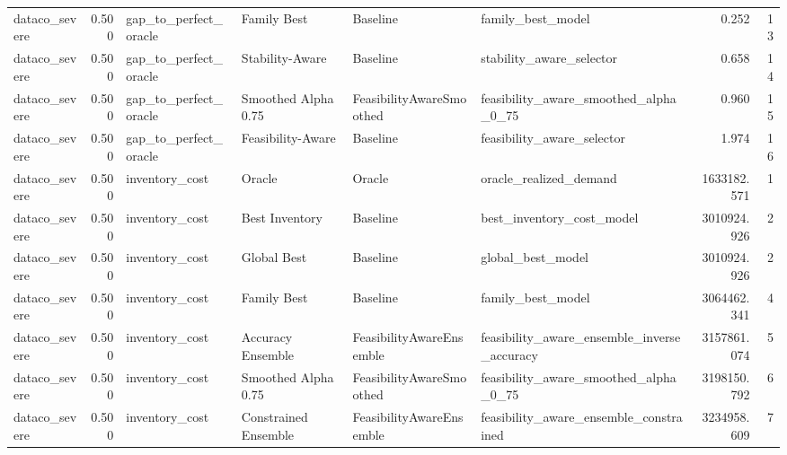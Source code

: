 \begin{table}
{\begin{tabular}{lrllllrr}
 dataco\_severe &             0.500 &       gap\_to\_perfect\_oracle &           Family Best &                  Baseline &                                  family\_best\_model &         0.252 &              13 \\
 dataco\_severe &             0.500 &       gap\_to\_perfect\_oracle &       Stability-Aware &                  Baseline &                           stability\_aware\_selector &         0.658 &              14 \\
 dataco\_severe &             0.500 &       gap\_to\_perfect\_oracle &   Smoothed Alpha 0.75 &  FeasibilityAwareSmoothed &              feasibility\_aware\_smoothed\_alpha\_0\_75 &         0.960 &              15 \\
 dataco\_severe &             0.500 &       gap\_to\_perfect\_oracle &     Feasibility-Aware &                  Baseline &                         feasibility\_aware\_selector &         1.974 &              16 \\
 dataco\_severe &             0.500 &              inventory\_cost &                Oracle &                    Oracle &                             oracle\_realized\_demand &   1633182.571 &               1 \\
 dataco\_severe &             0.500 &              inventory\_cost &        Best Inventory &                  Baseline &                          best\_inventory\_cost\_model &   3010924.926 &               2 \\
 dataco\_severe &             0.500 &              inventory\_cost &           Global Best &                  Baseline &                                  global\_best\_model &   3010924.926 &               2 \\
 dataco\_severe &             0.500 &              inventory\_cost &           Family Best &                  Baseline &                                  family\_best\_model &   3064462.341 &               4 \\
 dataco\_severe &             0.500 &              inventory\_cost &     Accuracy Ensemble &  FeasibilityAwareEnsemble &        feasibility\_aware\_ensemble\_inverse\_accuracy &   3157861.074 &               5 \\
 dataco\_severe &             0.500 &              inventory\_cost &   Smoothed Alpha 0.75 &  FeasibilityAwareSmoothed &              feasibility\_aware\_smoothed\_alpha\_0\_75 &   3198150.792 &               6 \\
 dataco\_severe &             0.500 &              inventory\_cost &  Constrained Ensemble &  FeasibilityAwareEnsemble &             feasibility\_aware\_ensemble\_constrained &   3234958.609 &               7 \\

\end{tabular}}
\end{table}
